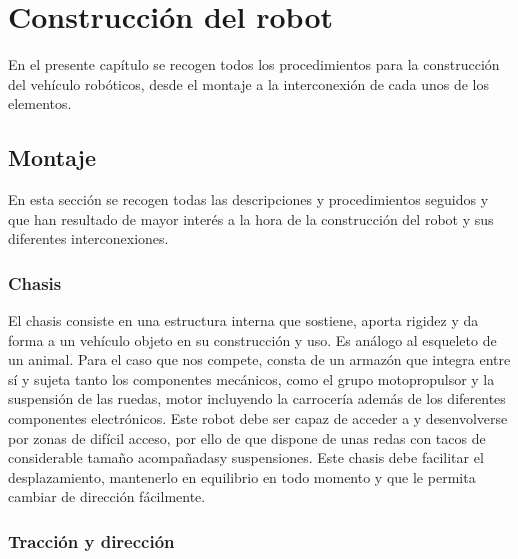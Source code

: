 

\newpage

\chapter{Construcción del robot}
\label{chap:montaje}


En el presente capítulo se recogen todos los procedimientos para la construcción del vehículo robóticos, desde el montaje a la interconexión de cada unos de los elementos.\\

\section{Montaje}

En esta sección se recogen todas las descripciones y procedimientos seguidos y que han resultado de mayor interés a la hora de la construcción del robot y 
sus diferentes interconexiones.\\

\subsection{Chasis}

El chasis consiste en una estructura interna que sostiene, aporta rigidez y da forma a un vehículo objeto en su construcción y uso. Es análogo al esqueleto de un animal.
Para el caso que nos compete, consta de un armazón​ que integra entre sí y sujeta tanto los componentes mecánicos, como el grupo motopropulsor y la suspensión de las ruedas,
motor incluyendo la carrocería además de los diferentes componentes electrónicos.​ Este robot debe ser capaz de acceder a y desenvolverse por zonas de difícil acceso, por ello de que dispone de unas redas con tacos de considerable tamaño 
acompañadasy suspensiones. Este chasis debe  facilitar el  desplazamiento, mantenerlo en equilibrio en todo momento y que le permita cambiar de dirección fácilmente.

\subsection{Tracción y dirección}

